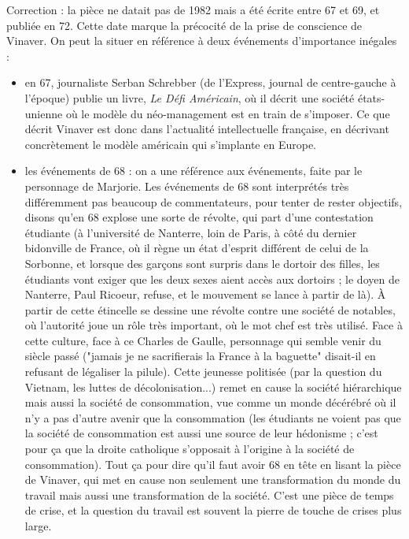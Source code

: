 \documentclass[a4paper,12pt]{book}
\begin{document}
\par Correction : la pièce ne datait pas de 1982 mais a été écrite entre 67 et 69, et publiée en 72. Cette date marque la précocité de la prise de conscience de Vinaver. On peut la situer en référence à deux événements d'importance inégales :\begin{itemize}
\item en 67, journaliste Serban Schrebber (de l'Express, journal de centre-gauche à l'époque) publie un livre, \textit{Le Défi Américain}, où il décrit une société états-unienne où le modèle du néo-management est en train de s'imposer. Ce que décrit Vinaver est donc dans l'actualité intellectuelle française, en décrivant concrètement le modèle américain qui s'implante en Europe.
\item les événements de 68 : on a une référence aux événements, faite par le personnage de Marjorie. Les événements de 68 sont interprétés très différemment pas beaucoup de commentateurs, pour tenter de rester objectifs, disons qu'en 68 explose une sorte de révolte, qui part d'une contestation étudiante (à l'université de Nanterre, loin de Paris, à côté du dernier bidonville de France, où il règne un état d'esprit différent de celui de la Sorbonne, et lorsque des garçons sont surpris dans le dortoir des filles, les étudiants vont exiger que les deux sexes aient accès aux dortoirs ; le doyen de Nanterre, Paul Ricoeur, refuse, et le mouvement se lance à partir de là). À partir de cette étincelle se dessine une révolte contre une société de notables, où l'autorité joue un rôle très important, où le mot chef est très utilisé. Face à cette culture, face à ce Charles de Gaulle, personnage qui semble venir du siècle passé ("jamais je ne sacrifierais la France à la baguette" disait-il en refusant de légaliser la pilule). Cette jeunesse politisée (par la question du Vietnam, les luttes de décolonisation...) remet en cause la société hiérarchique mais aussi la société de consommation, vue comme un monde décérébré où il n'y a pas d'autre avenir que la consommation (les étudiants ne voient pas que la société de consommation est aussi une source de leur hédonisme ; c'est pour ça que la droite catholique s'opposait à l'origine à la société de consommation). Tout ça pour dire qu'il faut avoir 68 en tête en lisant la pièce de Vinaver, qui met en cause non seulement une transformation du monde du travail mais aussi une transformation de la société. C'est une pièce de temps de crise, et la question du travail est souvent la pierre de touche de crises plus large.
\end{itemize}
\end{document}
